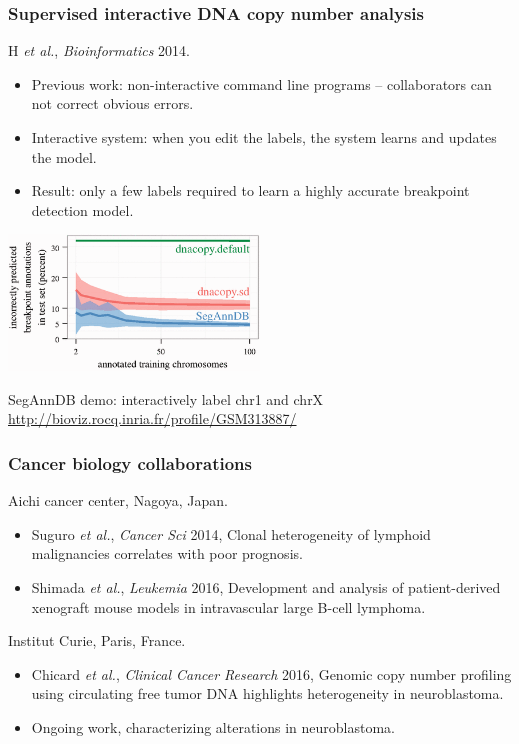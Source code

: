 \documentclass{beamer}
\begin{document}
\begin{frame}
  \frametitle{Supervised interactive DNA copy number analysis}
  H {\it et al.}, {\it Bioinformatics} 2014.

  \begin{itemize}
  \item Previous work: non-interactive command line programs
    -- collaborators can not correct obvious
    errors.
  \item Interactive system: when you edit the labels, the system
    learns and updates the model.
  \item Result: only a few labels required to learn a highly accurate
    breakpoint detection model.
  \end{itemize}

  \begin{center}
    \includegraphics[width=0.5\textwidth]{SegAnnDB-test-error-decreases}
  \end{center}

SegAnnDB demo: interactively label chr1 and chrX
  \url{http://bioviz.rocq.inria.fr/profile/GSM313887/}
\end{frame}

\begin{frame}
  \frametitle{Cancer biology collaborations}
  Aichi cancer center, Nagoya, Japan.
  \begin{itemize}
  \item Suguro {\it et al.}, {\it Cancer Sci} 2014, Clonal
    heterogeneity of lymphoid malignancies correlates with poor
    prognosis.
  \item Shimada {\it et al.}, {\it Leukemia} 2016, Development and
    analysis of patient-derived xenograft mouse models in
    intravascular large B-cell lymphoma.
  \end{itemize}
  Institut Curie, Paris, France.
  \begin{itemize}
  \item Chicard {\it et al.}, {\it Clinical Cancer Research} 2016,
    Genomic copy number profiling using circulating free tumor DNA
    highlights heterogeneity in neuroblastoma.
  \item Ongoing work, characterizing alterations in neuroblastoma.
  \end{itemize}
\end{frame}
\end{document}
